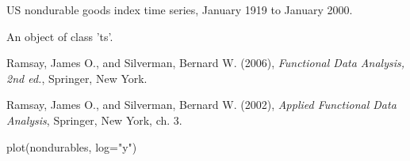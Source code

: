 \begin{Description}\relax
US nondurable goods index time series, January 1919 to January 2000.
\end{Description}
\begin{Format}\relax
An object of class 'ts'.
\end{Format}
\begin{Source}\relax
Ramsay, James O., and Silverman, Bernard W. (2006), \emph{Functional
Data Analysis, 2nd ed.}, Springer, New York. 

Ramsay, James O., and Silverman, Bernard W. (2002), \emph{Applied
Functional Data Analysis}, Springer, New York, ch. 3.
\end{Source}
\begin{Examples}
\begin{ExampleCode}
plot(nondurables, log="y")
\end{ExampleCode}
\end{Examples}

